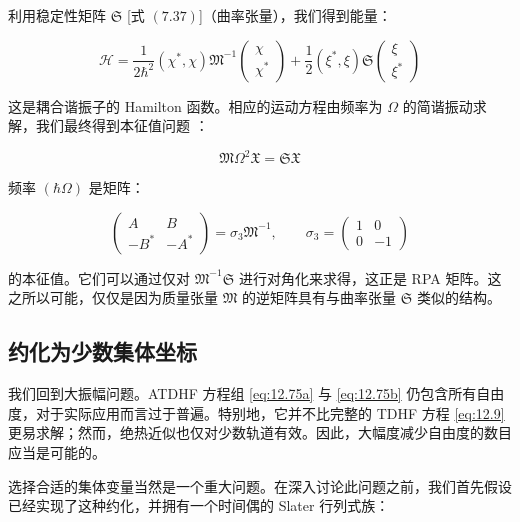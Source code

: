 利用稳定性矩阵 $\mathfrak{S}$ {[}式 $(7.37)${]}（曲率张量），我们得到能量：

\begin{equation}
\mathcal{H}=\frac{1}{2\hbar^{2}}(\chi^{*},\chi)\mathfrak{M}^{-1}\left(\begin{array}{c}
\chi\\
\chi^{*}
\end{array}\right)+\frac{1}{2}(\xi^{*},\xi)\mathfrak{S}\left(\begin{array}{c}
\xi\\
\xi^{*}
\end{array}\right)\label{eq:12.95}
\end{equation}

这是耦合谐振子的 Hamilton 函数。相应的运动方程由频率为 $\Omega$ 的简谐振动求解，我们最终得到本征值问题 \cite{Go59}：

\begin{equation}
\mathfrak{M}\Omega^{2}\mathfrak{X}=\mathfrak{S}\mathfrak{X}\label{eq:12.96}
\end{equation}

频率 $(\hbar\Omega)$ 是矩阵：

\begin{equation}
\left(\begin{array}{cc}
A & B\\
-B^{*} & -A^{*}
\end{array}\right)=\sigma_{3}\mathfrak{M}^{-1},\qquad\sigma_{3}=\left(\begin{array}{cc}
1 & 0\\
0 & -1
\end{array}\right)\label{eq:12.97}
\end{equation}

的本征值。它们可以通过仅对 $\mathfrak{M}^{-1}\mathfrak{S}$ 进行对角化来求得，这正是 RPA 矩阵。这之所以可能，仅仅是因为质量张量
$\mathfrak{M}$ 的逆矩阵具有与曲率张量 $\mathfrak{S}$ 类似的结构。

\subsection{约化为少数集体坐标\label{subsec:12.3.3}}

我们回到大振幅问题。ATDHF 方程组 \ref{eq:12.75a} 与 \ref{eq:12.75b} 仍包含所有自由度，对于实际应用而言过于普遍。特别地，它并不比完整的
TDHF 方程 \ref{eq:12.9} 更易求解；然而，绝热近似也仅对少数轨道有效。因此，大幅度减少自由度的数目应当是可能的。

选择合适的集体变量当然是一个重大问题。在深入讨论此问题之前，我们首先假设已经实现了这种约化，并拥有一个时间偶的 Slater 行列式族：

